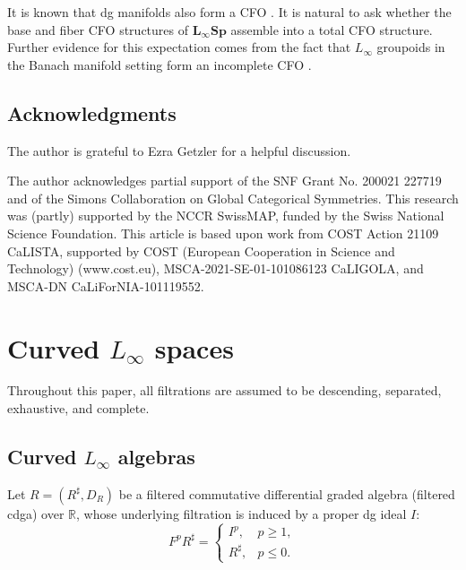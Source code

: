\documentclass[12pt]{amsart}
\numberwithin{equation}{section}
\theoremstyle{plain}
\newcommand{\R}{\mathbb{R}}
\newcommand{\uR}{{R^\sharp}}
\begin{document}
	It is known that dg manifolds also form a CFO \cites{Behrend2020thx,carchedi2023derivedmanifoldsdifferentialgraded}. It is natural to ask whether the base and fiber CFO structures of $\mathbf{L_\infty Sp}$ assemble into a total CFO structure. Further evidence for this expectation comes from the fact that $L_\infty$ groupoids in the Banach manifold setting form an incomplete CFO \cite{rogers2020homotopy}. 
	
	
 	\subsection*{Acknowledgments}
	
	The author is grateful to Ezra Getzler for a helpful discussion.
	
	The author acknowledges partial support of the SNF Grant No. 200021 227719 and of the Simons Collaboration on Global Categorical Symmetries. This research was (partly) supported by the NCCR SwissMAP, funded by the Swiss National Science Foundation. This article is based upon work from COST Action 21109 CaLISTA, supported by COST (European Cooperation in Science and Technology) (www.cost.eu), MSCA-2021-SE-01-101086123 CaLIGOLA, and MSCA-DN CaLiForNIA-101119552.
	
	
	
	\section{Curved \texorpdfstring{$L_\infty$}{L-infinity}  spaces}
	
	Throughout this paper, all filtrations are assumed to be descending, separated, exhaustive, and complete. 
	
	\subsection{Curved \texorpdfstring{$L_\infty$}{L-infinity}  algebras}
	
	Let $R=(\uR, D_R)$ be a filtered commutative differential graded algebra (filtered cdga) over $\R$, whose underlying filtration is induced by a proper dg ideal $I$:
	\[
	F^p \uR = 
	\begin{cases}
		I^p, & p \geq 1,\\
		\uR, & p \leq 0.
	\end{cases}
	\]
	
\end{document}

